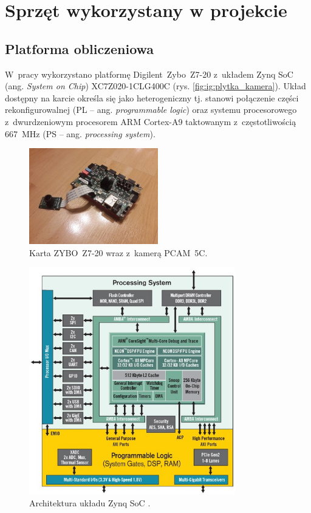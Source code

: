\chapter{Sprzęt wykorzystany w projekcie}
\label{cha:sprzet}


\section{Platforma obliczeniowa}
\label{sec:platforma_obliczeniowa}

W~pracy wykorzystano platformę Digilent~Zybo~Z7-20 z~układem Zynq SoC (ang. \textit{System on Chip}) XC7Z020-1CLG400C (rys. \ref{fig:ig:plytka_kamera}). 
Układ dostępny na karcie określa się jako heterogeniczny tj. stanowi połączenie części rekonfigurowalnej (PL -- ang. \textit{programmable logic}) oraz systemu procesorowego z~dwurdzeniowym procesorem ARM Cortex-A9 taktowanym z~częstotliwością 667~MHz (PS -- ang. \textit{processing system}).
\begin{figure}[h]
	\centering
	\includegraphics[width=0.5\textwidth]{plytka_kamera.jpg}
	\caption{Karta ZYBO~Z7-20 wraz z~kamerą PCAM~5C.}
	\label{fig:plytka_kamera}
\end{figure}
\begin{figure}[h]
	\centering
	\includegraphics[width=0.8\textwidth]{zynq.png}
	\caption{Architektura układu Zynq SoC \cite{zynq}.}
	\label{fig:zynq}
\end{figure}
